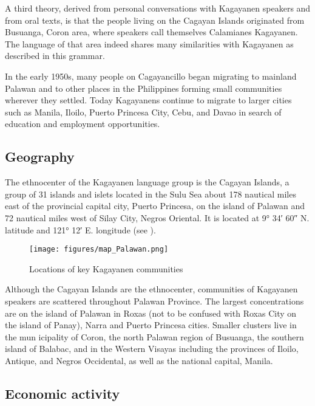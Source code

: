 A third theory, derived from personal conversations with Kagayanen speakers and from oral texts, is that the people living on the Cagayan Islands originated from Busuanga, Coron area, where speakers call themselves Calamianes Kagayanen. The language of that area indeed shares many similarities with Kagayanen as described in this grammar.

In the early 1950s, many people on Cagayancillo began migrating to mainland Palawan and to other places in the Philippines forming small communities wherever they settled. Today Kagayanens continue to migrate to larger cities such as Manila, Iloilo, Puerto Princesa City, Cebu, and Davao in search of education and employment opportunities.

\subsection{Geography}\label{sec:1.2.3}

The ethnocenter of the Kagayanen language group is the Cagayan Islands, a group of 31 islands and islets located in the Sulu Sea about 178 nautical miles east of the provincial capital city, Puerto Princesa, on the island of Palawan and 72 nautical miles west of Silay City, Negros Oriental. It is located at 9° 34′ 60″ N. latitude and 121° 12′ E. longitude (see ).

\begin{figure}
    \centering
    \texttt{[image: figures/map\_Palawan.png]}
    \caption{Locations of key Kagayanen communities}
    \label{fig:locationofkagayanencommunities}
\end{figure}
Although the Cagayan Islands are the ethnocenter, communities of Kagayanen speakers are scattered throughout Palawan Province. The largest concentrations are on the island of Palawan in Roxas (not to be confused with Roxas City on the island of Panay), Narra and Puerto Princesa cities. Smaller clusters live in the mun icipality of Coron, the north Palawan region of Busuanga, the southern island of Balabac, and in the Western Visayas including the provinces of Iloilo, Antique, and Negros Occidental, as well as the national capital, Manila. 

\subsection{Economic activity}\label{sec:1.2.4} \label{sec:economicactivity}
 

